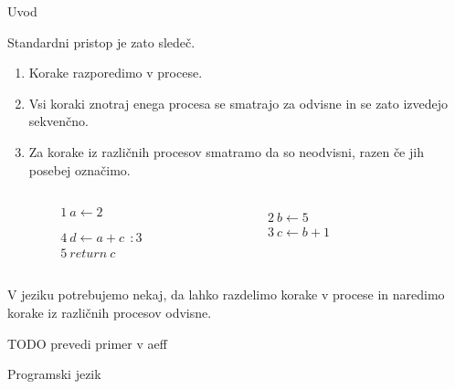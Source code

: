 \documentclass{beamer}
\theoremstyle{definition} %
\theoremstyle{plain} %
\begin{document}
	\begin{frame}[fragile]{Uvod}
		
		Standardni pristop je zato sledeč.
		\begin{enumerate}
			\item Korake razporedimo v procese.
			\item Vsi koraki znotraj enega procesa se smatrajo za odvisne in se zato izvedejo sekvenčno.
			\item Za korake iz različnih procesov smatramo da so neodvisni, razen če jih posebej označimo.
		\end{enumerate}
	
		\begin{columns}[T]
			\begin{column}{0.15\textwidth}
				\begin{align*}
				&1\ a \gets 2  \\
				& \\
				& \\
				&4\ d \gets a + c\ \ : 3 \\
				&5\ return\ c 
				\end{align*}
				\vspace{0.1ex}
			\end{column}
			\begin{column}{0.15\textwidth}
				\begin{align*}
				& &  \\
				&               &2\ b \gets 5 \\
				&               &3\ c \gets b + 1 \\
				&& \\
				&&\\
				\end{align*}
			\end{column}
			\begin{column}{0.05\textwidth}
			\end{column}
		\end{columns}
	
		
	\end{frame}

	\begin{frame}[fragile]{\aeff{}}
		V jeziku potrebujemo nekaj, da lahko razdelimo korake v procese in naredimo korake iz različnih procesov odvisne.
		
		
		TODO prevedi primer v aeff
		
		Programski jezik 
		
		
	\end{frame}
\end{document}
